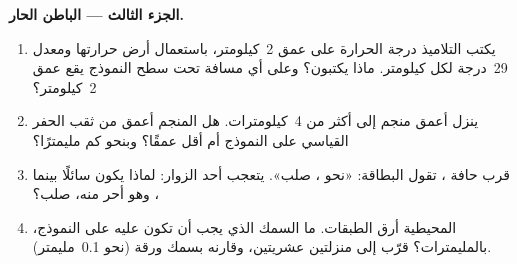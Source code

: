\begin{problem}
\medskip
\noindent\textbf{الجزء الثالث --- الباطن الحار.}
\begin{enumerate}[resume]
  \item يكتب التلاميذ درجة الحرارة على عمق 2~كيلومتر، باستعمال أرض حرارتها
         ومعدل 29~درجة لكل كيلومتر. ماذا يكتبون؟ وعلى
        أي مسافة تحت سطح النموذج يقع عمق 2~كيلومتر؟
  \item ينزل أعمق منجم إلى أكثر من 4~كيلومترات. هل المنجم أعمق
        من ثقب الحفر القياسي على النموذج أم أقل عمقًا؟ وبنحو كم
        مليمترًا؟
  \item قرب حافة ، تقول البطاقة: «نحو
        ، صلب». يتعجب أحد الزوار: لماذا يكون 
        سائلًا بينما ، وهو أحر منه، صلب؟
  \item {} المحيطية أرق الطبقات. ما السمك الذي يجب أن تكون عليه
        على النموذج، بالمليمترات؟ قرّب إلى منزلتين عشريتين، وقارنه
        بسمك ورقة (نحو 0.1~مليمتر).
\end{enumerate}
\end{problem}
